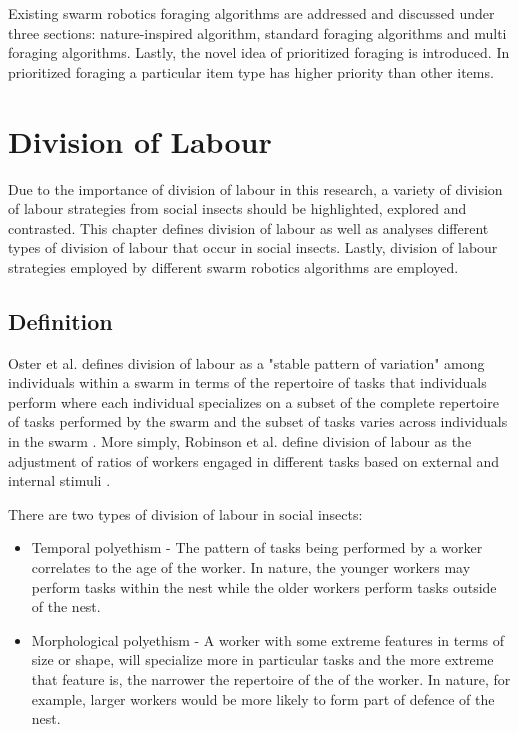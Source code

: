 Existing swarm robotics foraging algorithms are addressed and discussed under three sections: nature-inspired algorithm, standard foraging algorithms and multi foraging algorithms. Lastly, the novel idea of prioritized foraging is introduced. In prioritized foraging a particular item type has higher priority than other items. 

\chapter{Division of Labour}
\label{chap:divisionoflabour}

Due to the importance of division of labour in this research, a variety of division of labour strategies from social insects should be highlighted, explored and contrasted. This chapter defines division of labour as well as analyses different types of division of labour that occur in social insects. Lastly, division of labour strategies employed by different swarm robotics algorithms are employed. 

\section{Definition}
\label{sec:second:definition}

Oster et al. defines division of labour as a "stable pattern of variation" among individuals within a swarm in terms of the repertoire of tasks that individuals perform where each individual specializes on a subset of the complete repertoire of tasks performed by the swarm and the subset of tasks varies across individuals in the swarm \cite{oster1978caste}.  
More simply, Robinson et al. define division of labour as the adjustment of ratios of workers engaged in different tasks based on external and internal stimuli \cite{robinson1992regulation}.

There are two types of division of labour in social insects: 
\begin{itemize}
	\item Temporal polyethism - The pattern of tasks being performed by a worker correlates to the age of the worker. In nature, the younger workers may perform tasks within the nest while the older workers perform tasks outside of the nest.
	\item Morphological polyethism - A worker with some extreme features in terms of size or shape, will specialize more in particular tasks and the more extreme that feature is, the narrower the repertoire of the of the worker. In nature, for example, larger workers would be more likely to form part of defence of the nest. \cite{beshers2001models}
\end{itemize}

